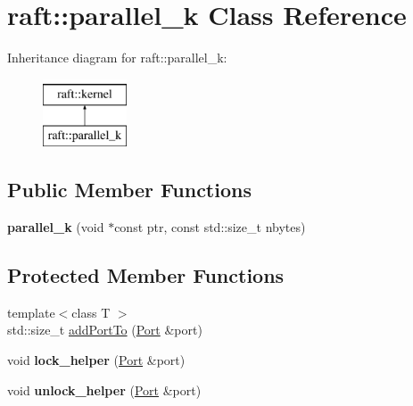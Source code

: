 \hypertarget{classraft_1_1parallel__k}{}\section{raft\+:\+:parallel\+\_\+k Class Reference}
\label{classraft_1_1parallel__k}
Inheritance diagram for raft\+:\+:parallel\+\_\+k\+:\begin{figure}[H]
\begin{center}
\leavevmode
\includegraphics[height=2.000000cm]{classraft_1_1parallel__k}
\end{center}
\end{figure}
\subsection*{Public Member Functions}
\begin{DoxyCompactItemize}
\item 
\hypertarget{classraft_1_1parallel__k_a7bc1c201f49ad35e35bffead39da7fc9}{}{\bfseries parallel\+\_\+k} (void $\ast$const ptr, const std\+::size\+\_\+t nbytes)\label{classraft_1_1parallel__k_a7bc1c201f49ad35e35bffead39da7fc9}

\end{DoxyCompactItemize}
\subsection*{Protected Member Functions}
\begin{DoxyCompactItemize}
\item 
{\footnotesize template$<$class T $>$ }\\std\+::size\+\_\+t \hyperlink{classraft_1_1parallel__k_a73b5ea02ddaf42293de155d0f256c854}{add\+Port\+To} (\hyperlink{class_port}{Port} \&port)
\item 
\hypertarget{classraft_1_1parallel__k_a60932e6e784dd7950d167b5d4ee5344f}{}void {\bfseries lock\+\_\+helper} (\hyperlink{class_port}{Port} \&port)\label{classraft_1_1parallel__k_a60932e6e784dd7950d167b5d4ee5344f}

\item 
\hypertarget{classraft_1_1parallel__k_a614bbcef8b5d5aa053e137ef4654be25}{}void {\bfseries unlock\+\_\+helper} (\hyperlink{class_port}{Port} \&port)\label{classraft_1_1parallel__k_a614bbcef8b5d5aa053e137ef4654be25}

\end{DoxyCompactItemize}
